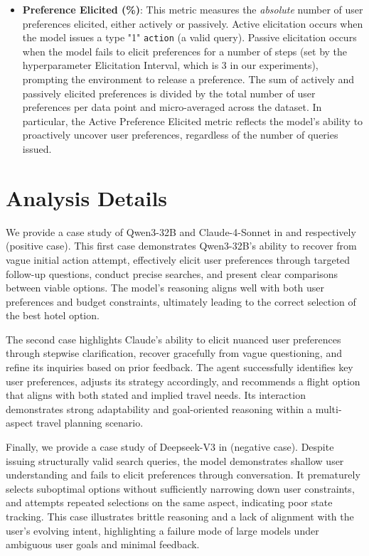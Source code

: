 \begin{itemize}[topsep=2pt, partopsep=-3pt, leftmargin=8pt]
\item \textbf{Preference Elicited (\%)}: This metric measures the \emph{absolute} number of user preferences elicited, either actively or passively. Active elicitation occurs when the model issues a type "1" \texttt{action} (a valid query). Passive elicitation occurs when the model fails to elicit preferences for a number of steps (set by the hyperparameter Elicitation Interval, which is 3 in our experiments), prompting the environment to release a preference. The sum of actively and passively elicited preferences is divided by the total number of user preferences per data point and micro-averaged across the dataset. In particular, the Active Preference Elicited metric reflects the model’s ability to proactively uncover user preferences, regardless of the number of queries issued.

\end{itemize}


\section{Analysis Details}
We provide a case study of Qwen3-32B and Claude-4-Sonnet in  and  respectively (positive case). This first case demonstrates Qwen3-32B's ability to recover from vague initial action attempt, effectively elicit user preferences through targeted follow-up questions, conduct precise searches, and present clear comparisons between viable options. The model's reasoning aligns well with both user preferences and budget constraints, ultimately leading to the correct selection of the best hotel option.

The second case highlights Claude's ability to elicit nuanced user preferences through stepwise clarification, recover gracefully from vague questioning, and refine its inquiries based on prior feedback. The agent successfully identifies key user preferences, adjusts its strategy accordingly, and recommends a flight option that aligns with both stated and implied travel needs. Its interaction demonstrates strong adaptability and goal-oriented reasoning within a multi-aspect travel planning scenario.

Finally, we provide a case study of Deepseek-V3 in  (negative case). Despite issuing structurally valid search queries, the model demonstrates shallow user understanding and fails to elicit preferences through conversation. It prematurely selects suboptimal options without sufficiently narrowing down user constraints, and attempts repeated selections on the same aspect, indicating poor state tracking. This case illustrates brittle reasoning and a lack of alignment with the user's evolving intent, highlighting a failure mode of large models under ambiguous user goals and minimal feedback.


